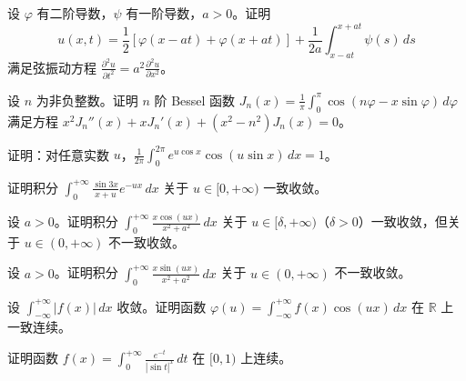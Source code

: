 \noindent\begin{minipage}{\textwidth}
设 $\varphi$ 有二阶导数，$\psi$ 有一阶导数，$a>0$。证明\[u(x,t)=\frac12[\varphi(x-at)+\varphi(x+at)]+\frac1{2a}\int_{x-at}^{x+at}\psi(s)\,ds\]满足弦振动方程 $\displaystyle\frac{\partial^2u}{\partial t^2}=a^2\frac{\partial^2u}{\partial x^2}$。
\end{minipage}\par\vfill
\noindent\begin{minipage}{\textwidth}
设 $n$ 为非负整数。证明 $n$ 阶 Bessel 函数 $\displaystyle J_n(x)=\frac1\pi\int_0^\pi\cos(n\varphi-x\sin\varphi)\,d\varphi$ 满足方程 $x^2J_n''(x)+xJ_n'(x)+(x^2-n^2)J_n(x)=0$。
\end{minipage}\par\vfill
\newpage
\noindent\begin{minipage}{\textwidth}
证明：对任意实数 $u$，$\displaystyle\frac1{2\pi}\int_0^{2\pi}e^{u\cos x}\cos(u\sin x)\,dx=1$。
\end{minipage}\par\vfill
\noindent\begin{minipage}{\textwidth}
证明积分 $\displaystyle\int_0^{+\infty}\frac{\sin3x}{x+u}e^{-ux}\,dx$ 关于 $u\in[0,+\infty)$ 一致收敛。
\end{minipage}\par\vfill
\noindent\begin{minipage}{\textwidth}
设 $a>0$。证明积分 $\displaystyle\int_0^{+\infty}\frac{x\cos(ux)}{x^2+a^2}\,dx$ 关于 $u\in[\delta,+\infty)$（$\delta>0$）一致收敛，但关于 $u\in(0,+\infty)$ 不一致收敛。
\end{minipage}\par\vfill
\noindent\begin{minipage}{\textwidth}
设 $a>0$。证明积分 $\displaystyle\int_0^{+\infty}\frac{x\sin(ux)}{x^2+a^2}\,dx$ 关于 $u\in(0,+\infty)$ 不一致收敛。
\end{minipage}\par\vfill
\newpage
\noindent\begin{minipage}{\textwidth}
设 $\displaystyle\int_{-\infty}^{+\infty}|f(x)|\,dx$ 收敛。证明函数 $\displaystyle\varphi(u)=\int_{-\infty}^{+\infty}f(x)\cos(ux)\,dx$ 在 $\mathbb R$ 上一致连续。
\end{minipage}\par\vfill
\noindent\begin{minipage}{\textwidth}
证明函数 $\displaystyle f(x)=\int_0^{+\infty}\frac{e^{-t}}{|\sin t|^x}\,dt$ 在 $[0,1)$ 上连续。
\end{minipage}\par\vfill
